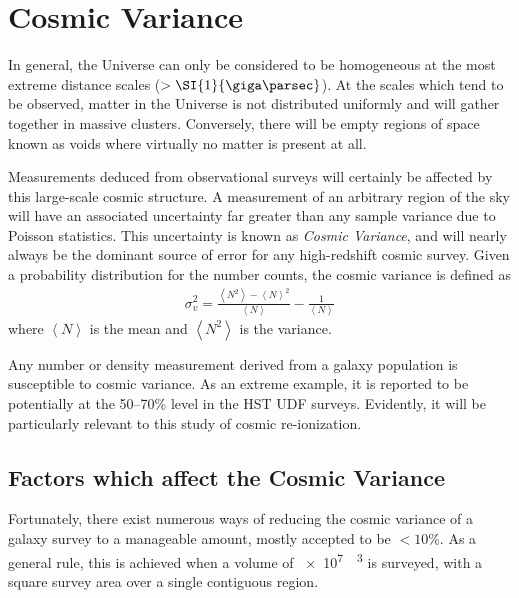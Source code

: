 
\section{Cosmic Variance} %
\label{sec:cosmic_variance}
	In general, the Universe can only be considered to be homogeneous at the most extreme distance scales ($>\SI{1}{\giga\parsec}$). At the scales which tend to be observed, matter in the Universe is not distributed uniformly and will gather together in massive clusters. Conversely, there will be empty regions of space known as voids where virtually no matter is present at all.

	Measurements deduced from observational surveys will certainly be affected by this large-scale cosmic structure. A measurement of an arbitrary region of the sky will have an associated uncertainty far greater than any sample variance due to Poisson statistics. This uncertainty is known as \emph{Cosmic Variance}, and will nearly always be the dominant source of error for any high-redshift cosmic survey. Given a probability distribution for the number counts, the cosmic variance is defined as
	\begin{align}
		\sigma_v^2= \frac{\left \langle N^2 \right \rangle - \left \langle N \right \rangle^2}{\left \langle N \right \rangle}-\frac{1}{\left \langle N \right \rangle} \label{eq:cvstat}
	\end{align}
	where $\left \langle N \right \rangle$ is the mean and $\left \langle N^2 \right \rangle$ is the variance\cite{Trenti2008}.

	Any number or density measurement derived from a galaxy population is susceptible to cosmic variance. As an extreme example, it is reported to be potentially at the 50--70\% level in the HST UDF surveys\cite{Driver01102010}. Evidently, it will be particularly relevant to this study of cosmic re-ionization.

	\subsection{Factors which affect the Cosmic Variance} %
	\label{sub:factors_which_affect_the_cosmic_variance}
		Fortunately, there exist numerous ways of reducing the cosmic variance of a galaxy survey to a manageable amount, mostly accepted to be $<10\%$. As a general rule, this is achieved when a volume of \SI{e7}{\mega\parsec\cubed} is surveyed, with a square survey area over a single contiguous region\cite{Driver01102010}.

